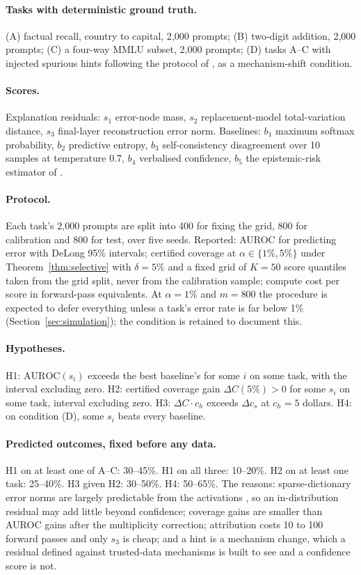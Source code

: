 \documentclass[11pt,letterpaper]{article}
\theoremstyle{plain}
\theoremstyle{definition}
\theoremstyle{remark}
\begin{document}
\paragraph{Tasks with deterministic ground truth.} (A) factual recall, country to capital, 2{,}000 prompts; (B) two-digit addition, 2{,}000 prompts; (C) a four-way MMLU subset, 2{,}000 prompts; (D) tasks A--C with injected spurious hints following the protocol of \citet{chen2025reasoning}, as a mechanism-shift condition.

\paragraph{Scores.} Explanation residuals: $s_1$ error-node mass, $s_2$ replacement-model total-variation distance, $s_3$ final-layer reconstruction error norm. Baselines: $b_1$ maximum softmax probability, $b_2$ predictive entropy, $b_3$ self-consistency disagreement over 10 samples at temperature 0.7, $b_4$ verbalised confidence, $b_5$ the epistemic-risk estimator of \citet{melo2026}.

\paragraph{Protocol.} Each task's 2{,}000 prompts are split into 400 for fixing the grid, 800 for calibration and 800 for test, over five seeds. Reported: AUROC for predicting error with DeLong 95\% intervals; certified coverage at $\alpha\in\{1\%,5\%\}$ under Theorem~\ref{thm:selective} with $\delta=5\%$ and a fixed grid of $K=50$ score quantiles taken from the grid split, never from the calibration sample; compute cost per score in forward-pass equivalents. At $\alpha=1\%$ and $m=800$ the procedure is expected to defer everything unless a task's error rate is far below 1\% (Section~\ref{sec:simulation}); the condition is retained to document this.

\paragraph{Hypotheses.} H1: $\mathrm{AUROC}(s_i)$ exceeds the best baseline's for some $i$ on some task, with the interval excluding zero. H2: certified coverage gain $\Delta C(5\%)>0$ for some $s_i$ on some task, interval excluding zero. H3: $\Delta C\cdot c_h$ exceeds $\Delta c_s$ at $c_h=5$ dollars. H4: on condition (D), some $s_i$ beats every baseline.

\paragraph{Predicted outcomes, fixed before any data.} H1 on at least one of A--C: 30--45\%. H1 on all three: 10--20\%. H2 on at least one task: 25--40\%. H3 given H2: 30--50\%. H4: 50--65\%. The reasons: sparse-dictionary error norms are largely predictable from the activations \citep{engels2024darkmatter}, so an in-distribution residual may add little beyond confidence; coverage gains are smaller than AUROC gains after the multiplicity correction; attribution costs 10 to 100 forward passes and only $s_3$ is cheap; and a hint is a mechanism change, which a residual defined against trusted-data mechanisms is built to see and a confidence score is not.
\end{document}
